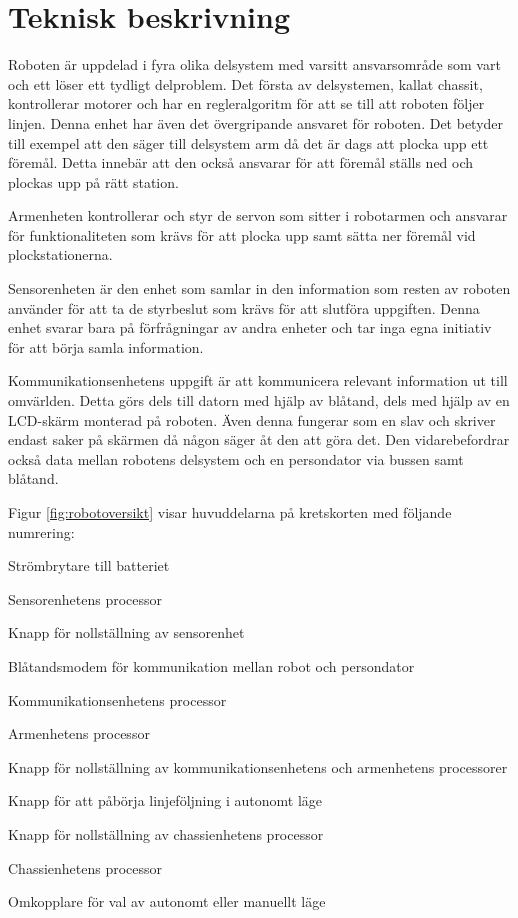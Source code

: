 
\section{Teknisk beskrivning}

Roboten är uppdelad i fyra olika delsystem med varsitt ansvarsområde som vart och ett löser ett tydligt delproblem. Det första av delsystemen, kallat chassit, kontrollerar motorer och har en regleralgoritm för att se till att roboten följer linjen. Denna enhet har även det övergripande ansvaret för roboten. Det betyder till exempel att den säger till delsystem arm då det är dags att plocka upp ett föremål. Detta innebär att den också ansvarar för att föremål ställs ned och plockas upp på rätt station.

Armenheten kontrollerar och styr de servon som sitter i robotarmen och ansvarar för funktionaliteten som krävs för att plocka upp samt sätta ner föremål vid plockstationerna.

Sensorenheten är den enhet som samlar in den information som resten av roboten använder för att ta de styrbeslut som krävs för att slutföra uppgiften. Denna enhet svarar bara på förfrågningar av andra enheter och tar inga egna initiativ för att börja samla information.

Kommunikationsenhetens uppgift är att kommunicera relevant information ut till omvärlden. Detta görs dels till datorn med hjälp av blåtand, dels med hjälp av en LCD-skärm monterad på roboten. Även denna fungerar som en slav och skriver endast saker på skärmen då någon säger åt den att göra det. Den vidarebefordrar också data mellan robotens delsystem och en persondator via bussen samt blåtand.



Figur \ref{fig:robotoversikt} visar huvuddelarna på kretskorten med följande numrering:
\begin{packed_enumerate}
\item Strömbrytare till batteriet
\item Sensorenhetens processor
\item Knapp för nollställning av sensorenhet
\item Blåtandsmodem för kommunikation mellan robot och persondator
\item Kommunikationsenhetens processor
\item Armenhetens processor
\item Knapp för nollställning av kommunikationsenhetens och armenhetens processorer
\item Knapp för att påbörja linjeföljning i autonomt läge
\item Knapp för nollställning av chassienhetens processor
\item Chassienhetens processor
\item Omkopplare för val av autonomt eller manuellt läge
\end{packed_enumerate}


